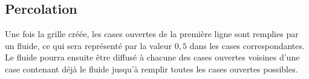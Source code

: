 \documentclass[t,10pt]{article}
\begin{document}
%
%
%
%
%
%
%
%
%
%

%
\subsection*{Percolation}\label{percolation}
%




Une fois la grille créée, les cases ouvertes de la première ligne sont
remplies par un fluide, ce qui sera représenté par la valeur $0,5$ dans
les cases correspondantes. Le fluide pourra ensuite être diffusé à
chacune des cases ouvertes voisines d'une case contenant déjà le fluide jusqu'à remplir toutes les cases ouvertes possibles.
\end{document}
